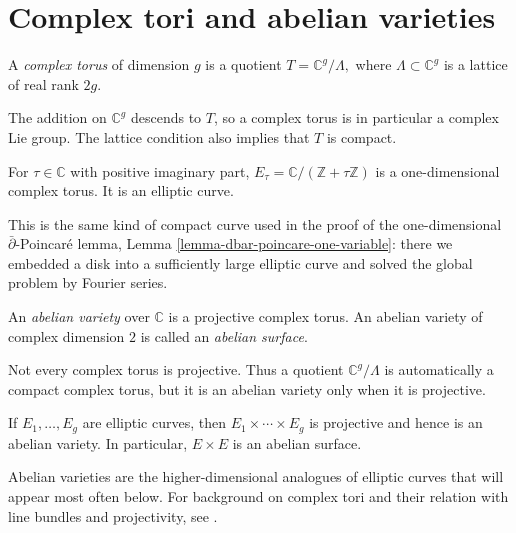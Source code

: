 \section{Complex tori and abelian varieties}
\label{section-complex-tori-abelian}

\begin{definition}
\label{definition-complex-torus}
A {\it complex torus} of dimension $g$ is a
quotient
$
T=\mathbb{C}^g/\Lambda,
$
where $\Lambda\subset\mathbb{C}^g$ is a
lattice of real rank $2g$.
\end{definition}

\noindent
The addition on $\mathbb{C}^g$ descends to
$T$, so a complex torus is in particular a
complex Lie group. The lattice condition
also implies that $T$ is compact.

\begin{example}
\label{example-elliptic-curve-torus}
For $\tau\in\mathbb{C}$ with positive
imaginary part,
$
E_\tau=
\mathbb{C}/(\mathbb{Z}+\tau\mathbb{Z})
$
is a one-dimensional complex torus.
It is an elliptic curve.

This is the same kind of compact curve used
in the proof of the one-dimensional
$\bar\partial$-Poincaré lemma,
Lemma
\ref{lemma-dbar-poincare-one-variable}:
there we embedded a disk into a sufficiently
large elliptic curve and solved the global
problem by Fourier series.
\end{example}

\begin{definition}
\label{definition-abelian-variety}
An {\it abelian variety} over
$\mathbb{C}$ is a projective complex torus.
An abelian variety of complex dimension $2$
is called an {\it abelian surface}.
\end{definition}

\begin{remark}
\label{remark-complex-torus-not-abelian}
Not every complex torus is projective.
Thus a quotient
$
\mathbb{C}^g/\Lambda
$
is automatically a compact complex torus,
but it is an abelian variety only when it is
projective.
\end{remark}

\begin{example}
\label{example-product-elliptic-abelian}
If $E_1,\ldots,E_g$ are elliptic curves,
then
$
E_1\times\cdots\times E_g
$
is projective and hence is an abelian
variety. In particular,
$
E\times E
$
is an abelian surface.
\end{example}

\noindent
Abelian varieties are the
higher-dimensional analogues of elliptic
curves that will appear most often below.
For background on complex tori and their
relation with line bundles and projectivity,
see \cite{huc}.

